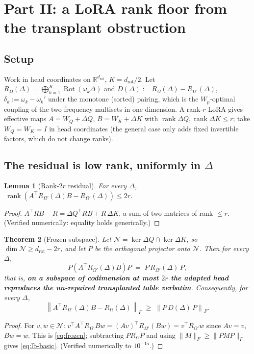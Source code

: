 \documentclass[11pt]{article}
\newtheorem{theorem}{Theorem}[section]
\newtheorem{lemma}[theorem]{Lemma}
\theoremstyle{definition}
\newcommand{\drot}{d_{\mathrm{rot}}}
\newcommand{\R}{\mathbb{R}}
\DeclareMathOperator{\rank}{rank}
\DeclareMathOperator{\Rot}{Rot}
\begin{document}
\section{Part II: a LoRA rank floor from the transplant obstruction}
\label{sec:rank}

\subsection{Setup}

Work in head coordinates on $\R^{\drot}$, $K=\drot/2$. Let
$R_\Omega(\Delta)=\bigoplus_{k=1}^K\Rot(\omega_k\Delta)$ and
$D(\Delta):=R_\Omega(\Delta)-R_{\Omega'}(\Delta)$, $\delta_k:=\omega_k-\omega_k'$ under the
monotone (sorted) pairing, which is the $W_p$-optimal coupling of the two frequency multisets in
one dimension. A rank-$r$ LoRA gives effective maps $A=W_Q+\Delta Q$, $B=W_K+\Delta K$ with
$\rank\Delta Q,\rank\Delta K\le r$; take $W_Q=W_K=I$ in head coordinates (the general case only
adds fixed invertible factors, which do not change ranks).

\subsection{The residual is low rank, uniformly in \texorpdfstring{$\Delta$}{Delta}}

\begin{lemma}[Rank-$2r$ residual]\label{lem:rank2r}
For every $\Delta$, $\ \rank\!\left(A^\top R_{\Omega'}(\Delta)B-R_{\Omega'}(\Delta)\right)\le 2r$.
\end{lemma}
\begin{proof}
$A^\top RB-R=\Delta Q^\top RB+R\,\Delta K$, a sum of two matrices of rank $\le r$.
(Verified numerically: equality holds generically.)
\end{proof}

\begin{theorem}[Frozen subspace]\label{thm:frozen}
Let $\mathcal N=\ker\Delta Q\cap\ker\Delta K$, so $\dim\mathcal N\ge\drot-2r$, and let $P$ be the
orthogonal projector onto $\mathcal N$. Then for every $\Delta$,
\begin{equation}
P\left(A^\top R_{\Omega'}(\Delta)B\right)P \;=\; P\,R_{\Omega'}(\Delta)\,P ,
\label{eq:frozen}
\end{equation}
that is, \textbf{on a subspace of codimension at most $2r$ the adapted head reproduces the
un-repaired transplanted table verbatim}. Consequently, for every $\Delta$,
\begin{equation}
\left\|A^\top R_{\Omega'}(\Delta)B-R_\Omega(\Delta)\right\|_F\;\ge\;\left\|P\,D(\Delta)\,P\right\|_F .
\label{eq:lb-basic}
\end{equation}
\end{theorem}
\begin{proof}
For $v,w\in\mathcal N$: $v^\top A^\top R_{\Omega'}Bw=(Av)^\top R_{\Omega'}(Bw)=v^\top R_{\Omega'}w$
since $Av=v$, $Bw=w$. This is \eqref{eq:frozen}; subtracting $PR_\Omega P$ and using
$\|M\|_F\ge\|PMP\|_F$ gives \eqref{eq:lb-basic}. (Verified numerically to $10^{-15}$.)
\end{proof}
\end{document}
